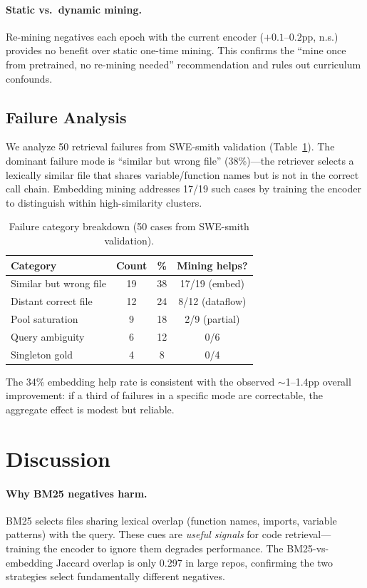 \documentclass[11pt,a4paper]{article}
\begin{document}
\paragraph{Static vs.\ dynamic mining.} Re-mining negatives each epoch with the current encoder ($+0.1$--$0.2$pp, n.s.) provides no benefit over static one-time mining. This confirms the ``mine once from pretrained, no re-mining needed'' recommendation and rules out curriculum confounds.

\subsection{Failure Analysis}

We analyze 50 retrieval failures from SWE-smith validation (Table~\ref{tab:failure}). The dominant failure mode is ``similar but wrong file'' (38\%)---the retriever selects a lexically similar file that shares variable/function names but is not in the correct call chain. Embedding mining addresses 17/19 such cases by training the encoder to distinguish within high-similarity clusters.

\begin{table}[t]
\centering
\small
\caption{Failure category breakdown (50 cases from SWE-smith validation).}
\label{tab:failure}
\begin{tabular}{lccc}
\toprule
Category & Count & \% & Mining helps? \\
\midrule
Similar but wrong file & 19 & 38 & 17/19 (embed) \\
Distant correct file & 12 & 24 & 8/12 (dataflow) \\
Pool saturation & 9 & 18 & 2/9 (partial) \\
Query ambiguity & 6 & 12 & 0/6 \\
Singleton gold & 4 & 8 & 0/4 \\
\bottomrule
\end{tabular}
\end{table}

The 34\% embedding help rate is consistent with the observed $\sim$1--1.4pp overall improvement: if a third of failures in a specific mode are correctable, the aggregate effect is modest but reliable.

\section{Discussion}

\paragraph{Why BM25 negatives harm.} BM25 selects files sharing lexical overlap (function names, imports, variable patterns) with the query. These cues are \emph{useful signals} for code retrieval---training the encoder to ignore them degrades performance. The BM25-vs-embedding Jaccard overlap is only 0.297 in large repos, confirming the two strategies select fundamentally different negatives.
\end{document}
